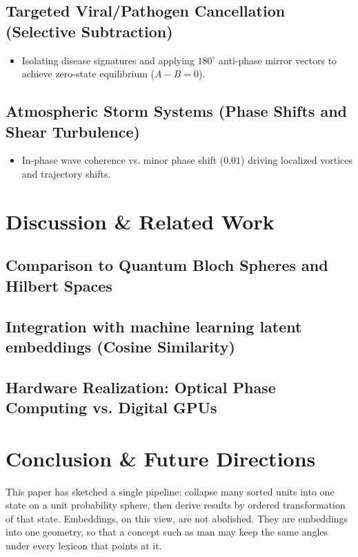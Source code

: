 \documentclass[12pt, a4paper]{article}
\begin{document}
\subsection{Targeted Viral/Pathogen Cancellation (Selective Subtraction)}
\begin{itemize}
    \item Isolating disease signatures and applying $180^\circ$ anti-phase mirror vectors to achieve zero-state equilibrium ($A - B = 0$).
\end{itemize}

\subsection{Atmospheric Storm Systems (Phase Shifts and Shear Turbulence)}
\begin{itemize}
    \item In-phase wave coherence vs. minor phase shift ($0.01$) driving localized vortices and trajectory shifts.
\end{itemize}

\section{Discussion \& Related Work}
\subsection{Comparison to Quantum Bloch Spheres and Hilbert Spaces}
\subsection{Integration with machine learning latent embeddings (Cosine Similarity)}
\subsection{Hardware Realization: Optical Phase Computing vs. Digital GPUs}

\section{Conclusion \& Future Directions}
\label{sec:conclusion}

This paper has sketched a single pipeline: collapse many sorted units
into one state on a unit probability sphere, then derive results by
ordered transformation of that state. Embeddings, on this view, are
not abolished. They are embeddings into one geometry, so that a
concept such as $\mathrm{man}$ may keep the same angles under every
lexicon that points at it.
\end{document}
